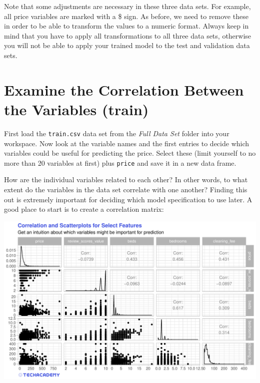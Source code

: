 \documentclass[
  11pt,
]{book}
\begin{document}
Note that some adjustments are necessary in these three data sets. For
example, all price variables are marked with a \$ sign. As before, we
need to remove these in order to be able to transform the values to a
numeric format. Always keep in mind that you have to apply all
transformations to all three data sets, otherwise you will not be able
to apply your trained model to the test and validation data sets.

\hypertarget{examine-the-correlation-between-the-variables-train}{%
\section{Examine the Correlation Between the Variables
(train)}\label{examine-the-correlation-between-the-variables-train}}

First load the \texttt{train.csv} data set from the \emph{Full Data Set}
folder into your workspace. Now look at the variable names and the first
entries to decide which variables could be useful for predicting the
price. Select these (limit yourself to no more than 20 variables at
first) plus \texttt{price} and save it in a new data frame.

How are the individual variables related to each other? In other words,
to what extent do the variables in the data set correlate with one
another? Finding this out is extremely important for deciding which
model specification to use later. A good place to start is to create a
correlation matrix:

\begin{center}\includegraphics[width=1\linewidth]{plot/5_1_ggpairs} \end{center}
\end{document}
